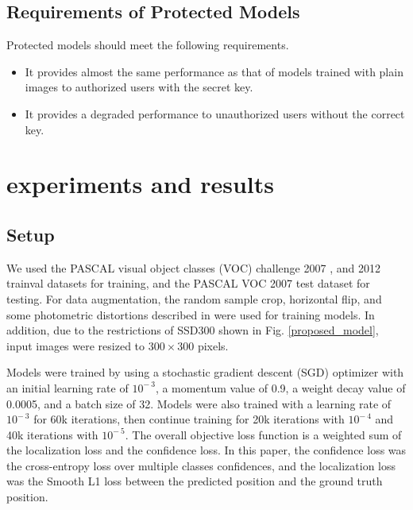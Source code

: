 \documentclass[conference,10pt,a4paper]{IEEEtran}
\begin{document}
\subsection{Requirements of Protected Models}
Protected models should meet the following requirements.
\begin{itemize}
    \item It provides almost the same performance as that of models trained with plain images to authorized users with the secret key.
    \item It provides a degraded performance to unauthorized users without the correct
key.
\end{itemize}
\section{experiments and results}
\subsection{Setup}
We used the PASCAL visual object classes (VOC) challenge 2007 \cite{everingham2010pascal}, and 2012 \cite{everingham2015pascal} trainval datasets for training, and the PASCAL VOC 2007 test dataset for testing. 
For data augmentation, the random sample crop, horizontal flip, and some photometric distortions described in \cite{liu2016ssd} were used for training models. In addition, due to the restrictions of SSD300 shown in Fig. \ref{proposed_model}, input images were resized to $300\times300$ pixels.\par
Models were trained by using a stochastic gradient descent (SGD) optimizer with an initial learning rate of $10^{-\:3}$, a momentum value of 0.9, a weight decay value of 0.0005, and a batch size of 32.
Models were also trained with a learning rate of $10^{-\:3}$ for 60k iterations, then continue training for 20k iterations with $10^{-\:4}$ and 40k iterations with $10^{-\:5}$. The overall objective loss function is a weighted sum of the localization loss and the confidence loss. 
In this paper, the confidence loss was the cross-entropy loss over multiple classes confidences, and the localization loss was the Smooth L1 loss between the predicted position and the ground truth position.
\end{document}
